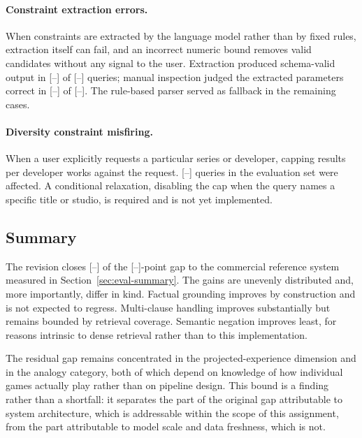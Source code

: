 \paragraph{Constraint extraction errors.}
When constraints are extracted by the language model rather than by fixed rules,
extraction itself can fail, and an incorrect numeric bound removes valid
candidates without any signal to the user. Extraction produced schema-valid
output in [--] of [--] queries; manual inspection judged the extracted
parameters correct in [--] of [--]. The rule-based parser served as fallback in
the remaining cases.

\paragraph{Diversity constraint misfiring.}
When a user explicitly requests a particular series or developer, capping
results per developer works against the request. [--] queries in the evaluation
set were affected. A conditional relaxation, disabling the cap when the query
names a specific title or studio, is required and is not yet implemented.

\subsection{Summary}
\label{sec:post-eval-summary}

The revision closes [--] of the [--]-point gap to the commercial reference
system measured in Section~\ref{sec:eval-summary}. The gains are unevenly
distributed and, more importantly, differ in kind. Factual grounding improves by
construction and is not expected to regress. Multi-clause handling improves
substantially but remains bounded by retrieval coverage. Semantic negation
improves least, for reasons intrinsic to dense retrieval rather than to this
implementation.

The residual gap remains concentrated in the projected-experience dimension and
in the analogy category, both of which depend on knowledge of how individual
games actually play rather than on pipeline design. This bound is a finding
rather than a shortfall: it separates the part of the original gap attributable
to system architecture, which is addressable within the scope of this
assignment, from the part attributable to model scale and data freshness, which
is not.
